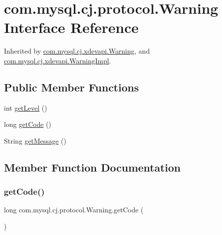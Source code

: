 \hypertarget{interfacecom_1_1mysql_1_1cj_1_1protocol_1_1_warning}{}\section{com.\+mysql.\+cj.\+protocol.\+Warning Interface Reference}
\label{interfacecom_1_1mysql_1_1cj_1_1protocol_1_1_warning}


Inherited by \mbox{\hyperlink{interfacecom_1_1mysql_1_1cj_1_1xdevapi_1_1_warning}{com.\+mysql.\+cj.\+xdevapi.\+Warning}}, and \mbox{\hyperlink{classcom_1_1mysql_1_1cj_1_1xdevapi_1_1_warning_impl}{com.\+mysql.\+cj.\+xdevapi.\+Warning\+Impl}}.

\subsection*{Public Member Functions}
\begin{DoxyCompactItemize}
\item 
int \mbox{\hyperlink{interfacecom_1_1mysql_1_1cj_1_1protocol_1_1_warning_a37396ddf66dbd9e7cd386825e0a47966}{get\+Level}} ()
\item 
long \mbox{\hyperlink{interfacecom_1_1mysql_1_1cj_1_1protocol_1_1_warning_a2cce849fce9ca14b8e1d673a24b4d1d2}{get\+Code}} ()
\item 
String \mbox{\hyperlink{interfacecom_1_1mysql_1_1cj_1_1protocol_1_1_warning_ae984bc89101642345d59a9dac4b32782}{get\+Message}} ()
\end{DoxyCompactItemize}


\subsection{Member Function Documentation}
\mbox{\label{interfacecom_1_1mysql_1_1cj_1_1protocol_1_1_warning_a2cce849fce9ca14b8e1d673a24b4d1d2}} 
\subsubsection{\texorpdfstring{get\+Code()}{getCode()}}
{\footnotesize\ttfamily long com.\+mysql.\+cj.\+protocol.\+Warning.\+get\+Code (\begin{DoxyParamCaption}{ }\end{DoxyParamCaption})}

